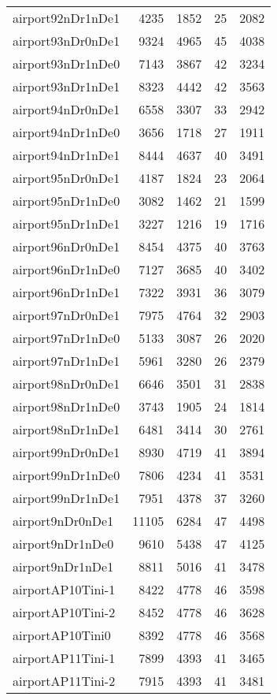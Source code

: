 \begin{longtable}{lrrrr}
airport92nDr1nDe1 & 4235 & 1852 & 25 & 2082 \\
airport93nDr0nDe1 & 9324 & 4965 & 45 & 4038 \\
airport93nDr1nDe0 & 7143 & 3867 & 42 & 3234 \\
airport93nDr1nDe1 & 8323 & 4442 & 42 & 3563 \\
airport94nDr0nDe1 & 6558 & 3307 & 33 & 2942 \\
airport94nDr1nDe0 & 3656 & 1718 & 27 & 1911 \\
airport94nDr1nDe1 & 8444 & 4637 & 40 & 3491 \\
airport95nDr0nDe1 & 4187 & 1824 & 23 & 2064 \\
airport95nDr1nDe0 & 3082 & 1462 & 21 & 1599 \\
airport95nDr1nDe1 & 3227 & 1216 & 19 & 1716 \\
airport96nDr0nDe1 & 8454 & 4375 & 40 & 3763 \\
airport96nDr1nDe0 & 7127 & 3685 & 40 & 3402 \\
airport96nDr1nDe1 & 7322 & 3931 & 36 & 3079 \\
airport97nDr0nDe1 & 7975 & 4764 & 32 & 2903 \\
airport97nDr1nDe0 & 5133 & 3087 & 26 & 2020 \\
airport97nDr1nDe1 & 5961 & 3280 & 26 & 2379 \\
airport98nDr0nDe1 & 6646 & 3501 & 31 & 2838 \\
airport98nDr1nDe0 & 3743 & 1905 & 24 & 1814 \\
airport98nDr1nDe1 & 6481 & 3414 & 30 & 2761 \\
airport99nDr0nDe1 & 8930 & 4719 & 41 & 3894 \\
airport99nDr1nDe0 & 7806 & 4234 & 41 & 3531 \\
airport99nDr1nDe1 & 7951 & 4378 & 37 & 3260 \\
airport9nDr0nDe1 & 11105 & 6284 & 47 & 4498 \\
airport9nDr1nDe0 & 9610 & 5438 & 47 & 4125 \\
airport9nDr1nDe1 & 8811 & 5016 & 41 & 3478 \\
airportAP10Tini-1 & 8422 & 4778 & 46 & 3598 \\
airportAP10Tini-2 & 8452 & 4778 & 46 & 3628 \\
airportAP10Tini0 & 8392 & 4778 & 46 & 3568 \\
airportAP11Tini-1 & 7899 & 4393 & 41 & 3465 \\
airportAP11Tini-2 & 7915 & 4393 & 41 & 3481 \\

\end{longtable}
